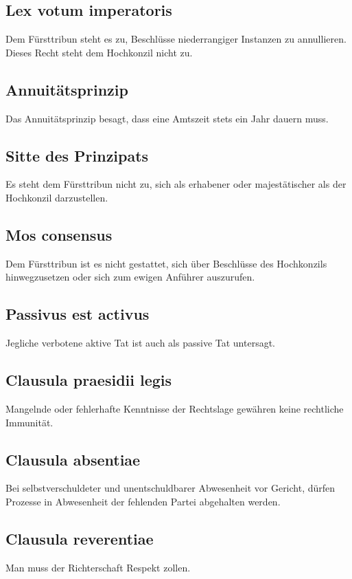 \documentclass{article}
\begin{document}
\subsection{Lex votum imperatoris}
Dem Fürsttribun steht es zu, Beschlüsse niederrangiger Instanzen zu annullieren. Dieses Recht steht dem Hochkonzil nicht zu.

\subsection{Annuitätsprinzip}
Das Annuitätsprinzip besagt, dass eine Amtszeit stets ein Jahr dauern muss.

\subsection{Sitte des Prinzipats}
Es steht dem Fürsttribun nicht zu, sich als erhabener oder majestätischer als der Hochkonzil darzustellen.

\subsection{Mos consensus}
Dem Fürsttribun ist es nicht gestattet, sich über Beschlüsse des Hochkonzils hinwegzusetzen oder sich zum ewigen Anführer auszurufen.

\subsection{Passivus est activus}
Jegliche verbotene aktive Tat ist auch als passive Tat untersagt.

\subsection{Clausula praesidii legis}
Mangelnde oder fehlerhafte Kenntnisse der Rechtslage gewähren keine rechtliche Immunität.

\subsection{Clausula absentiae}
Bei selbstverschuldeter und unentschuldbarer Abwesenheit vor Gericht, dürfen Prozesse in Abwesenheit der fehlenden Partei abgehalten werden.

\subsection{Clausula reverentiae}
Man muss der Richterschaft Respekt zollen.
\end{document}
